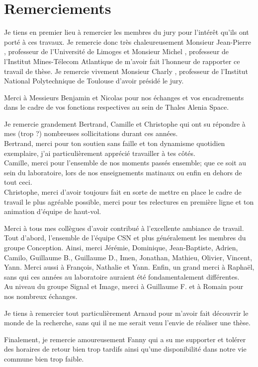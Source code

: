 {}
\chapter*{Remerciements}

Je tiens en premier lieu à remercier les membres du jury pour l'intérêt qu'ils ont porté à ces travaux. Je remercie donc
très chaleureusement Monsieur Jean-Pierre , professeur de l'Université de Limoges et Monsieur Michel
, professeur de l'Institut Mines-Télecom Atlantique de m'avoir fait l'honneur de rapporter ce travail de thèse.
Je remercie vivement Monsieur Charly , professeur de l'Institut National Polytechnique de Toulouse
d'avoir présidé le jury.


Merci à Messieurs Benjamin  et Nicolas  pour nos échanges et vos encadrements
dans le cadre de vos fonctions respectives au sein de Thales Alenia Space.

Je remercie grandement Bertrand, Camille et Christophe qui ont su répondre à mes (trop ?) nombreuses sollicitations durant
ces années.\\
Bertrand, merci pour ton soutien sans faille et ton dynamisme quotidien exemplaire, j'ai particulièrement apprécié travailler
à tes côtés. \\
Camille, merci pour l'ensemble de nos moments passés ensemble; que ce soit au sein du laboratoire, lors de nos
enseignements matinaux ou enfin en dehors de tout ceci.\\
Christophe, merci d'avoir toujours fait en sorte de mettre en place le cadre de travail le plus agréable possible, merci
pour tes relectures en première ligne et ton animation d'équipe de haut-vol.

Merci à tous mes collègues d'avoir contribué à l'excellente ambiance de travail. Tout d'abord, l'ensemble de l'équipe CSN
et plus généralement les membres du groupe Conception. Ainsi, merci Jérémie, Dominique, Jean-Baptiste, Adrien, Camilo,
Guillaume B., Guillaume D., Imen, Jonathan, Mathieu, Olivier, Vincent, Yann.  Merci aussi à François, Nathalie et Yann.
Enfin, un grand merci à Raphaël, sans qui ces années au laboratoire auraient été fondamentalement différentes.\\
Au niveau du groupe Signal et Image, merci à Guillaume F. et à Romain pour nos nombreux échanges.

Je tiens à remercier tout particulièrement Arnaud pour m'avoir fait découvrir le monde de la recherche, sans qui il ne me serait
venu l'envie de réaliser une thèse.

Finalement, je remercie amoureusement Fanny qui a su me supporter et tolérer des horaires de retour bien trop tardifs
ainsi qu'une disponibilité dans notre vie commune bien trop faible.
